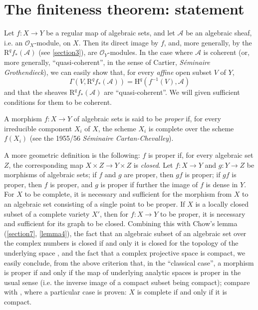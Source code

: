 \documentclass{article}
\theoremstyle{plain}
\theoremstyle{definition}
\newenvironment{definition}[1]
    {\renewcommand\theinnercustomdefinition{#1}\innercustomdefinition}
    {\endinnercustomdefinition}
\newcommand{\sh}{\mathscr}
\newcommand{\HH}{\mathrm{H}}
\newcommand{\RR}{\mathrm{R}}
\newcommand{\oldpage}[1]{\marginpar{\footnotesize$\Big\vert$ \textit{p.~#1}}}
\begin{document}
\section{The finiteness theorem: statement}
\label{section5}

Let $f\colon X\to Y$ be a regular map of algebraic sets, and let $\sh{A}$ be an algebraic sheaf, i.e. an $\sh{O}_X$-module, on $X$.
Then its direct image by $f$, and, more generally, by the $\RR^qf_*(\sh{A})$ (see \cref{section3}), are $\sh{O}_Y$-modules.
In the case where $\sh{A}$ is coherent (or, more generally, ``quasi-coherent'', in the sense of Cartier, \emph{S\'{e}minaire Grothendieck}), we can easily show that, for every \emph{affine} open subset $V$ of $Y$,
\[
  \Gamma(V,\RR^qf_*(\sh{A})) = \HH^q(f^{-1}(V),\sh{A})
\]
and that the sheaves $\RR^qf_*(\sh{A})$ are ``quasi-coherent''.
We will given sufficient conditions for them to be coherent.

\begin{definition}{2}
\label{definition2}
  A morphism $f\colon X\to Y$ of algebraic sets is said to be \emph{proper} if, for every irreducible component $X_i$ of $X$, the scheme $X_i$ is complete over the scheme $f(X_i)$ (see the 1955/56 \emph{S\'{e}minaire Cartan-Chevalley}).
\end{definition}

A more geometric definition is the following: $f$ is proper if, for every algebraic set $Z$, the corresponding map $X\times Z\to Y\times Z$ is \emph{closed}.
Let $f\colon X\to Y$ and $g\colon Y\to Z$ be morphisms of algebraic sets;
if $f$ and $g$ are proper, then $gf$ is proper;
if $gf$ is proper, then $f$ is proper, and $g$ is proper if further the image of $f$ is dense in $Y$.
For $X$ to be complete, it is necessary and sufficient for the morphism from $X$ to an algebraic set consisting of a single point to be proper.
If $X$ is a locally closed subset of a complete variety $X'$, then for $f\colon X\to Y$ to be proper, it is necessary and sufficient for its graph to be closed.
Combining this with Chow's lemma (\cref{section7}, \cref{lemma4}), the fact that an algebraic subset of an algebraic set over the complex numbers is closed if and only it is closed for the topology of the underlying space \cite[proposition~7, page~12]{2}, and the fact that a complex projective space is compact, we easily conclude, from the
\oldpage{2-08}
above criterion that, in the ``classical case'', a morphism is proper if and only if the map of underlying analytic spaces is proper in the usual sense (i.e. the inverse image of a compact subset being compact);
compare with \cite[proposition~12, proposition~6]{2}, where a particular case is proven: $X$ is complete if and only if it is compact.
\end{document}
